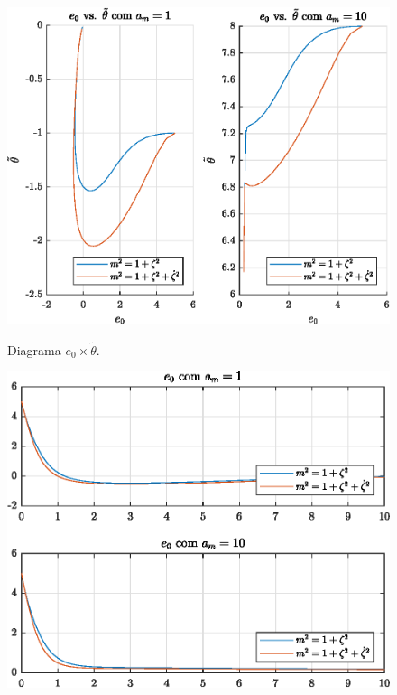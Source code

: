 \bigskip%
\begin{figure}[H]
  \centering
  \includegraphics[width=12cm]{figs/e0_vs_deltatheta/am1am10.eps} \\[2mm]
  \caption{Diagrama $e_0 \times \tilde{\theta}$.}
\end{figure}

\begin{figure}[H]
  \centering
  \includegraphics[width=12cm]{figs/e0/am1am10.eps}
\end{figure}

